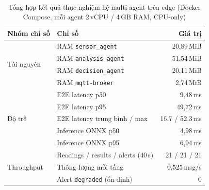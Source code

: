 \begin{table}[htbp]
  \centering
  \caption{Tổng hợp kết quả thực nghiệm hệ multi-agent trên edge
    (Docker Compose, mỗi agent 2\,vCPU / 4\,GB RAM, CPU-only)}
  \label{tab:tong-hop-thuc-nghiem}
  \begin{tabular}{llr}
    \toprule
    \textbf{Nhóm chỉ số} & \textbf{Chỉ số} & \textbf{Giá trị} \\
    \midrule
    \multirow{4}{*}{Tài nguyên}
      & RAM \texttt{sensor\_agent} & 20,89\,MiB \\
      & RAM \texttt{analysis\_agent} & 51,54\,MiB \\
      & RAM \texttt{decision\_agent} & 20,11\,MiB \\
      & RAM \texttt{mqtt-broker} & 2,74\,MiB \\
    \midrule
    \multirow{5}{*}{Độ trễ}
      & E2E latency p50 & 9,48\,ms \\
      & E2E latency p95 & 49,72\,ms \\
      & E2E latency trung bình / max & 16,7 / 52,3\,ms \\
      & Inference ONNX p50 & 4,98\,ms \\
      & Inference ONNX p95 & 6,94\,ms \\
    \midrule
    \multirow{3}{*}{Throughput}
      & Readings / results / alerts (40\,s) & 21 / 21 / 21 \\
      & Thông lượng mỗi tầng & 0,525\,msg/s \\
      & Alert \texttt{degraded} (ổn định) & 0 \\
    \bottomrule
  \end{tabular}
\end{table}
